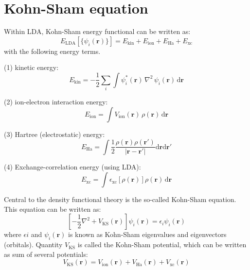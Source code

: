 \section{Kohn-Sham equation}

Within LDA, Kohn-Sham energy functional can be written as:
\begin{equation}
E_{\mathrm{LDA}}\left[\{\psi_{i}(\mathbf{r})\}\right] = 
E_{\mathrm{kin}} + E_{\mathrm{ion}} + E_{\mathrm{Ha}} + E_{\mathrm{xc}}
\end{equation}
with the following energy terms.

(1) kinetic energy:
\begin{equation}
E_{\mathrm{kin}} = -\frac{1}{2}\sum_{i} \int
\psi_{i}^{*}(\mathbf{r})\,\nabla^2\,\psi_{i}(\mathbf{r})
\,\mathrm{d}\mathbf{r}
\end{equation}

(2) ion-electron interaction energy:
\begin{equation}
E_{\mathrm{ion}} = \int V_{\mathrm{ion}}(\mathbf{r})\, \rho(\mathbf{r})\,
\mathrm{d}\mathbf{r}
\end{equation}

(3) Hartree (electrostatic) energy:
\begin{equation}
E_{\mathrm{Ha}} = \int \frac{1}{2}
\dfrac{\rho(\mathbf{r})\rho(\mathbf{r}')}
{\left|\mathbf{r} - \mathbf{r}'\right|}
\mathrm{d}\mathbf{r}\mathrm{d}\mathbf{r}'
\end{equation}

(4) Exchange-correlation energy (using LDA):
\begin{equation}
E_{\mathrm{xc}} = \int \epsilon_{\mathrm{xc}}\left[\rho(\mathbf{r})\right]
\rho(\mathbf{r})\,\mathrm{d}\mathbf{r}
\end{equation}

Central to the density functional theory is the so-called Kohn-Sham
equation.
This equation can be written as:
\begin{equation}
\left[
-\frac{1}{2}\nabla^2  + V_{\mathrm{KS}}(\mathbf{r})
\right] \psi_{i}(\mathbf{r}) =
\epsilon_{i}\psi_{i}(\mathbf{r})
\end{equation}
where $\epsilon{i}$ and $\psi_{i}(\mathbf{r})$ is known as Kohn-Sham
eigenvalues and eigenvectors (orbitals).
Quantity $V_{\mathrm{KS}}$ is called the Kohn-Sham potential, which can be
written as sum of several potentials:
\begin{equation}
V_{\mathrm{KS}}(\mathbf{r}) = V_{\mathrm{ion}}(\mathbf{r}) + V_{\mathrm{Ha}}(\mathbf{r})
+ V_{\mathrm{xc}}(\mathbf{r})
\label{eq:KS-pot}
\end{equation}


